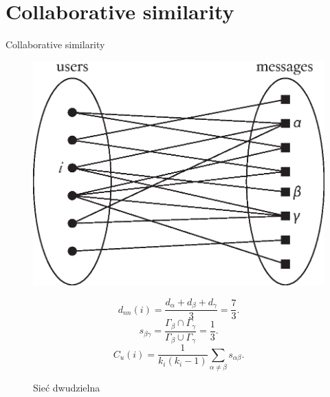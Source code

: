 \documentclass{beamer}
\begin{document}
\section{Collaborative similarity}
\begin{frame}{Collaborative similarity}
  \begin{figure}[H]
    \centering
    \begin{minipage}[h]{0.4\textwidth}
      \centering
      \includegraphics[width=\textwidth]{cs_network}
      \caption{Sieć dwudzielna}
      \label{fig:path}
    \end{minipage}
    \begin{minipage}[h]{0.58\textwidth}
      \begin{equation}
        d_{nn}(i) = \frac{d_\alpha + d_\beta + d_\gamma}{3} = \frac{7}{3} \mbox{.}
      \end{equation}
      \begin{equation}
        s_{\beta\gamma} = \frac{\Gamma_\beta \cap \Gamma_\gamma}{\Gamma_\beta \cup \Gamma_\gamma} = \frac{1}{3} \mbox{.}
      \end{equation}
      \begin{equation}
        C_u(i) = \frac{1}{k_i(k_i-1)} \sum_{\alpha\neq\beta} s_{\alpha\beta}\mbox{.}
      \end{equation}
    \end{minipage}
  \end{figure}
\end{frame}
\end{document}
